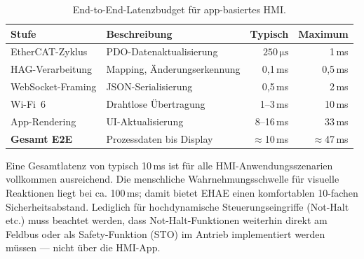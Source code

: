 ﻿\documentclass[12pt,a4paper]{article}
\begin{document}
\begin{table}[H]
\centering
\caption{End-to-End-Latenzbudget für app-basiertes HMI.}
\label{tab:latency}
\begin{tabularx}{\textwidth}{lXrr}
\toprule
\textbf{Stufe}         & \textbf{Beschreibung}          & \textbf{Typisch}             & \textbf{Maximum} \\
\midrule
EtherCAT-Zyklus        & PDO-Datenaktualisierung        & $250\,\si{\micro\second}$    & 1\,ms \\
HAG-Verarbeitung       & Mapping, Änderungserkennung    & 0{,}1\,ms                   & 0{,}5\,ms \\
WebSocket-Framing      & JSON-Serialisierung            & 0{,}5\,ms                   & 2\,ms \\
Wi-Fi~6                & Drahtlose Übertragung          & 1--3\,ms                    & 10\,ms \\
App-Rendering          & UI-Aktualisierung              & 8--16\,ms                   & 33\,ms \\
\midrule
\textbf{Gesamt E2E}    & Prozessdaten bis Display       & $\approx$10\,ms             & $\approx$47\,ms \\
\bottomrule
\end{tabularx}
\end{table}

Eine Gesamtlatenz von typisch 10\,ms ist für alle HMI-Anwendungsszenarien vollkommen
ausreichend. Die menschliche Wahrnehmungsschwelle für visuelle Reaktionen liegt bei ca.
100\,ms; damit bietet EHAE einen komfortablen 10-fachen Sicherheitsabstand. Lediglich
für hochdynamische Steuerungseingriffe (Not-Halt etc.) muss beachtet werden, dass
Not-Halt-Funktionen weiterhin direkt am Feldbus oder als Safety-Funktion (STO) im Antrieb
implementiert werden müssen --- nicht über die HMI-App.
\end{document}
